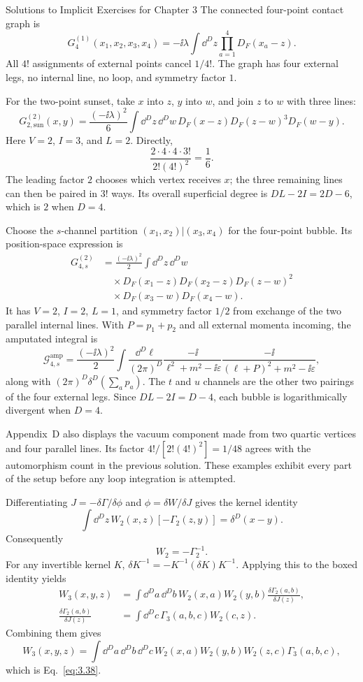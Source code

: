 \begin{bankssolutions}{Solutions to Implicit Exercises for Chapter 3}
The connected four-point contact graph is
\[
 G^{(1)}_4(x_1,x_2,x_3,x_4)
 =-\ii\lambda\int\dd^D z\prod_{a=1}^4D_F(x_a-z).
\]
All $4!$ assignments of external points cancel $1/4!$.  The graph has four
external legs, no internal line, no loop, and symmetry factor $1$.

For the two-point sunset, take $x$ into $z$, $y$ into $w$, and join $z$ to
$w$ with three lines:
\[
 G^{(2)}_{2,\mathrm{sun}}(x,y)
 =\frac{(-\ii\lambda)^2}{6}
 \int\dd^D z\,\dd^D w\,
 D_F(x-z)D_F(z-w)^3D_F(w-y).
\]
Here $V=2$, $I=3$, and $L=2$.  Directly,
\[
 \frac{2\cdot4\cdot4\cdot3!}{2!(4!)^2}=\frac16.
\]
The leading factor $2$ chooses which vertex receives $x$; the three remaining
lines can then be paired in $3!$ ways.  Its overall superficial degree is
$DL-2I=2D-6$, which is $2$ when $D=4$.

Choose the $s$-channel partition $(x_1,x_2)|(x_3,x_4)$ for the four-point
bubble.  Its position-space expression is
\[
\begin{aligned}
 G^{(2)}_{4,s}
 &=\frac{(-\ii\lambda)^2}{2}
   \int\dd^D z\,\dd^D w\\
 &\quad{}\times D_F(x_1-z)D_F(x_2-z)D_F(z-w)^2\\
 &\quad{}\times D_F(x_3-w)D_F(x_4-w).
\end{aligned}
\]
It has $V=2$, $I=2$, $L=1$, and symmetry factor $1/2$ from exchange of the
two parallel internal lines.  With $P=p_1+p_2$ and all external momenta
incoming, the amputated integral is
\[
 \mathcal G^{\mathrm{amp}}_{4,s}
 =\frac{(-\ii\lambda)^2}{2}
 \int\frac{\dd^D\ell}{(2\pi)^D}
 \frac{-\ii}{\ell^2+m^2-\ii\varepsilon}
 \frac{-\ii}{(\ell+P)^2+m^2-\ii\varepsilon},
\]
along with $(2\pi)^D\delta^D(\sum_ap_a)$.  The $t$ and $u$ channels are the
other two pairings of the four external legs.  Since $DL-2I=D-4$, each bubble
is logarithmically divergent when $D=4$.

Appendix~D also displays the vacuum component made from two quartic vertices
and four parallel lines.  Its factor
\(4!/[2!(4!)^2]=1/48\) agrees with the automorphism count in the previous
solution.  These examples exhibit every part of the setup before any loop
integration is attempted.

Differentiating $J=-\delta\Gamma/\delta\phi$ and
$\phi=\delta W/\delta J$ gives the kernel identity
\[
 \int\dd^D z\,W_2(x,z)[-\Gamma_2(z,y)]=\delta^D(x-y).
\]
Consequently
\[
 \boxed{W_2=-\Gamma_2^{-1}}.
\]
For any invertible kernel $K$,
\(\delta K^{-1}=-K^{-1}(\delta K)K^{-1}\).  Applying this to the boxed
identity yields
\begin{align*}
 W_3(x,y,z)
 &=\int\dd^D a\,\dd^D b\,
 W_2(x,a)W_2(y,b)\frac{\delta\Gamma_2(a,b)}{\delta J(z)},\\
 \frac{\delta\Gamma_2(a,b)}{\delta J(z)}
 &=\int\dd^D c\,\Gamma_3(a,b,c)W_2(c,z).
\end{align*}
Combining them gives
\[
 W_3(x,y,z)=\int\dd^D a\,\dd^D b\,\dd^D c\,
 W_2(x,a)W_2(y,b)W_2(z,c)\Gamma_3(a,b,c),
\]
which is Eq.~\eqref{eq:3.38}.


\end{bankssolutions}
